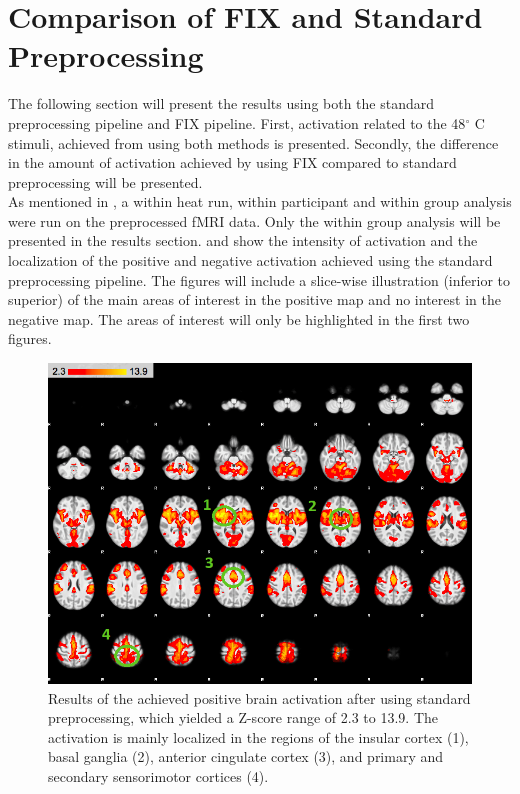 \section{Comparison of FIX and Standard Preprocessing}\label{sec:comp}

The following section will present the results using both the standard preprocessing pipeline and FIX pipeline. First, activation related to the 48$^\circ$ C stimuli, achieved from using both methods is presented. Secondly, the difference in the amount of activation achieved by using FIX compared to standard preprocessing will be presented. \\
As mentioned in , a within heat run, within participant and within group analysis were run on the preprocessed fMRI data. Only the within group analysis will be presented in the results section.  and  show the intensity of activation and the localization of the positive and negative activation achieved using the standard preprocessing pipeline. The figures will include a slice-wise illustration (inferior to superior) of the main areas of interest in the positive map and no interest in the negative map. The areas of interest will only be highlighted in the first two figures.     


\begin{figure}[H]                 
	\includegraphics[width=.65\textwidth]{figures/Results/STD_pos_1}  
	\caption{Results of the achieved positive brain activation after using standard preprocessing, which yielded a Z-score range of 2.3 to 13.9. The activation is mainly localized in the regions of the insular cortex (1), basal ganglia (2), anterior cingulate cortex (3), and primary and secondary sensorimotor cortices (4).}
	\label{fig:res:stdpos} 
\end{figure}

